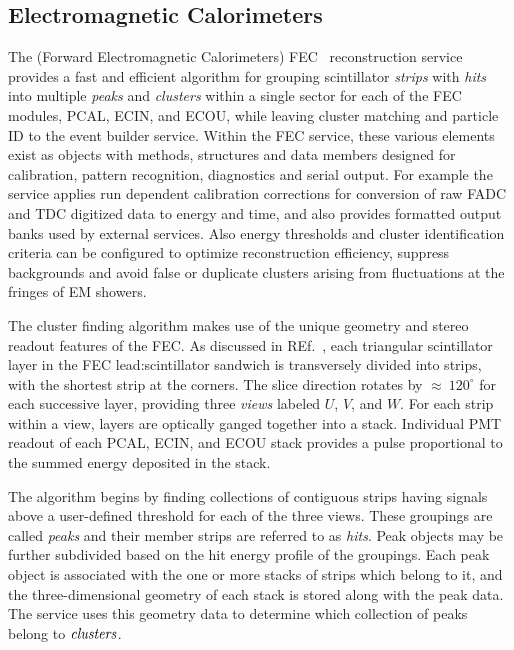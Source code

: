 \subsection{Electromagnetic Calorimeters}

The (Forward Electromagnetic Calorimeters) FEC~\cite{ec-nim} reconstruction service provides a fast and efficient algorithm for grouping scintillator {\it strips} with
{\it hits} into multiple {\it peaks} and {\it clusters} within a single sector for each of the FEC modules, PCAL, ECIN,
and ECOU, while leaving cluster matching and particle ID to the event builder service.  Within the FEC service, these
various elements exist as objects with methods, structures and data members designed for calibration, pattern
recognition, diagnostics and serial output.  For example the service applies run dependent calibration corrections for
conversion of raw FADC and TDC digitized data to energy and time, and also provides formatted output banks used by
external services.  Also energy thresholds and cluster identification criteria can be configured to optimize reconstruction
efficiency, suppress backgrounds and avoid false or duplicate clusters arising from fluctuations at the fringes of EM
showers.

The cluster finding algorithm makes use of the unique geometry and stereo readout features of the FEC. As discussed
in REf.~\cite{ec-nim}, each triangular scintillator layer in the FEC lead:scintillator sandwich is transversely divided into strips, with the
shortest strip at the corners. The slice direction rotates by $\approx~120^{\circ}$ for each successive layer, providing
three {\it views} labeled $U$, $V$, and $W$.  For each strip within a view, layers are optically ganged together into a
stack.  Individual PMT readout of each PCAL, ECIN, and ECOU stack provides a pulse proportional to the summed energy
deposited in the stack.

The algorithm begins by finding collections of contiguous strips having signals above a user-defined threshold for each of
the three views. These groupings are called {\it peaks} and their member strips are referred to as {\it hits}.  Peak objects
may be further subdivided based on the hit energy profile of the groupings.  Each peak object is associated with the one or
more stacks of strips which belong to it, and the three-dimensional geometry of each stack is stored along with the peak
data. The service uses this geometry data to determine which collection of peaks belong to $\it{clusters}$.

